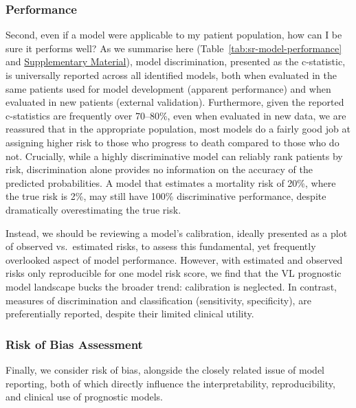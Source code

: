 \subsubsection{Performance}

Second, even if a model were applicable to my patient population, how can I be sure it performs well? As we summarise here (Table~\ref{tab:sr-model-performance} and \href{https://github.com/jpwil/dphil}{Supplementary Material}), model discrimination, presented as the c-statistic, is universally reported across all identified models, both when evaluated in the same patients used for model development (apparent performance) and when evaluated in new patients (external validation). Furthermore, given the reported c-statistics are frequently over 70--80\%, even when evaluated in new data, we are reassured that in the appropriate population, most models do a fairly good job at assigning higher risk to those who progress to death compared to those who do not. Crucially, while a highly discriminative model can reliably rank patients by risk, discrimination alone provides no information on the accuracy of the predicted probabilities. A model that estimates a mortality risk of 20\%, where the true risk is 2\%, may still have 100\% discriminative performance, despite dramatically overestimating the true risk.

Instead, we should be reviewing a model's calibration, ideally presented as a plot of observed vs.\ estimated risks, to assess this fundamental, yet frequently overlooked aspect of model performance\cite{vancalster2019}. However, with estimated and observed risks only reproducible for one model risk score\cite{coura-vitalPrognosticFactorsScoring2014}, we find that the VL prognostic model landscape bucks the broader trend: calibration is neglected\cite{wynants2020,collinsExternalValidationMultivariable2014,bouwmeesterReportingMethodsClinical2012}. In contrast, measures of discrimination and classification (sensitivity, specificity), are preferentially reported, despite their limited clinical utility\cite{moons2019}.

\subsubsection{Risk of Bias Assessment}

Finally, we consider risk of bias, alongside the closely related issue of model reporting, both of which directly influence the interpretability, reproducibility, and clinical use of prognostic models.

